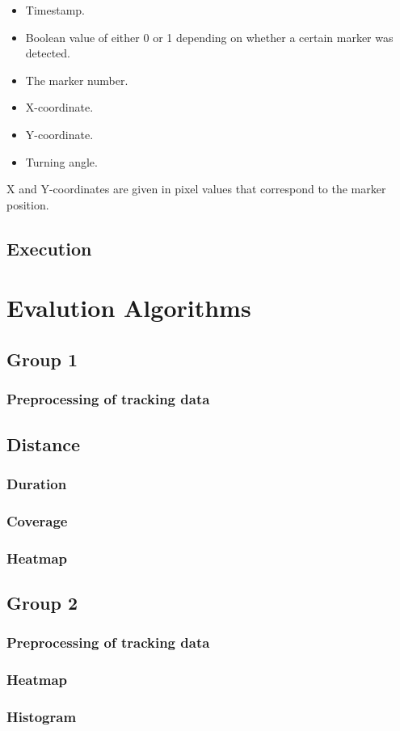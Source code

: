 \documentclass[twoside]{article}
\begin{document}
\begin{itemize}
	\item Timestamp.
	\item Boolean value of either 0 or 1 depending on whether a certain marker was detected.
	\item The marker number. 
	\item X-coordinate.
	\item Y-coordinate.
	\item Turning angle.
\end{itemize}
X and Y-coordinates are given in pixel values that correspond to the marker position. 




\subsection{Execution} %

\section{Evalution Algorithms}
\subsection{Group 1}
\subsubsection{Preprocessing of tracking data} %
\subsection{Distance} %
\subsubsection{Duration} %
\subsubsection{Coverage} %
\subsubsection{Heatmap} %

\subsection{Group 2} %
\subsubsection{Preprocessing of tracking data}
\subsubsection{Heatmap}
\subsubsection{Histogram}

\end{document}
